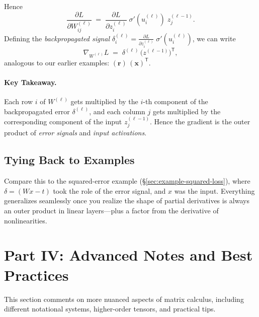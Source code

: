 \documentclass[11pt]{article}
\begin{document}
Hence
\[
\frac{\partial L}{\partial W^{(\ell)}_{ij}}
\;=\;
\frac{\partial L}{\partial z^{(\ell)}_{i}}\;
\sigma'(u^{(\ell)}_i)\;
z^{(\ell-1)}_j.
\]
Defining the \emph{backpropagated signal} 
$\delta^{(\ell)}_i = \frac{\partial L}{\partial z^{(\ell)}_{i}}\;\sigma'(u^{(\ell)}_i)$, 
we can write
\[
\nabla_{W^{(\ell)}} L
\;=\;
\delta^{(\ell)}\,\bigl(z^{(\ell-1)}\bigr)^\mathsf{T},
\]
analogous to our earlier examples: $(\mathbf{r})\,(\mathbf{x})^\mathsf{T}$.

\paragraph{Key Takeaway.}
Each row $i$ of $W^{(\ell)}$ gets multiplied by the $i$-th component of the backpropagated error $\delta^{(\ell)}$, 
and each column $j$ gets multiplied by the corresponding component of the input $z_j^{(\ell-1)}$. 
Hence the gradient is the outer product of \emph{error signals} and \emph{input activations}. 

\subsection{Tying Back to Examples}
Compare this to the squared-error example (\S\ref{sec:example-squared-loss}), 
where $\delta = (Wx - t)$ took the role of the error signal, 
and $x$ was the input. 
Everything generalizes seamlessly once you realize the shape of partial derivatives 
is always an outer product in linear layers---plus a factor from the derivative of nonlinearities.

\vspace{1cm}
\section{Part IV: Advanced Notes and Best Practices}
\label{sec:advanced-notes}

This section comments on more nuanced aspects of matrix calculus, 
including different notational systems, higher-order tensors, and practical tips.
\end{document}

